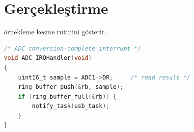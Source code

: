 \section{Gerçekleştirme}
\label{sec:gerceklestirme}

 örnekleme kesme rutinini gösterir.

\begin{lstlisting}[language=C, caption={ADC kesme rutini.}, label={lst:isr}]
/* ADC conversion-complete interrupt */
void ADC_IRQHandler(void)
{
    uint16_t sample = ADC1->DR;     /* read result */
    ring_buffer_push(&rb, sample);
    if (ring_buffer_full(&rb)) {
        notify_task(usb_task);
    }
}
\end{lstlisting}
